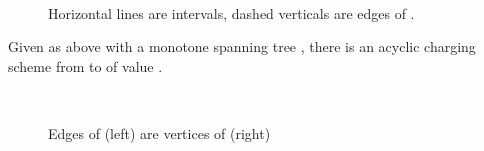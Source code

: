 \documentclass{llncs}
\begin{document}
\begin{figure}[ht]
\begin{center}
\mbox{
}
\caption{Horizontal lines are intervals, dashed verticals are edges of .}
\label{fig:pages}
\end{center}
\end{figure}

\begin{lemma}\label{lem:T2scheme} Given  as above with a monotone
spanning tree , there is an acyclic 
charging scheme from  to  of value .
\end{lemma}

\begin{figure}[ht]
\begin{center}
\mbox{
}
\caption{Edges of  (left) are vertices of  (right)}
\label{fig:trees}
\end{center}
\end{figure}
\end{document}
